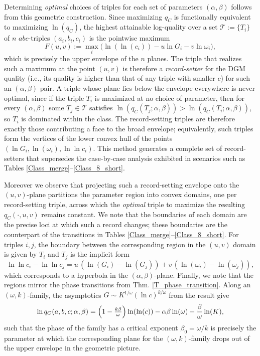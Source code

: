 \documentclass[11pt,letterpaper]{amsart}
\begin{document}
  Determining \textit{optimal} choices of triples for each set of parameters $(\alpha, \beta)$ follows from this geometric construction. Since maximizing $q_C$ is functionally equivalent to maximizing
  $\ln (q_C)$, the highest attainable log-quality over a set $\mathscr{T} := \{T_i\}$ of $n$ $abc$-triples $(a_i, b_i, c_i)$ is the pointwise maximum
  \[
      F(u,v) := \max_i\bigl(\ln(\ln (c_i)) -u\ln G_i-v\ln\omega_i\bigr),
  \]
  which is precisely the upper envelope of the $n$ planes. The triple that realizes such a maximum at the point $(u,v)$ is therefore a \textit{record-setter} for the DGM quality (i.e., its quality is higher than that of any triple with smaller $c$) for such an $(\alpha,\beta)$ pair. A triple whose plane lies below the envelope everywhere is never optimal, since if the triple $T_i$ is maximized at no choice of parameter, then for every
  $(\alpha,\beta)$ some $T_j \in \mathscr{T}$ satisfies $\ln (q_C(T_j; \alpha, \beta))>\ln (q_C(T_i; \alpha, \beta))$, so $T_i$ is dominated
  within the class. The record-setting triples are therefore exactly
  those contributing a face to the broad envelope; equivalently, such triples form the vertices of the lower convex hull of the points $(\ln G_i,\ln(\omega_i),\ln\ln c_i)$. This method generates a complete set of record-setters that  supersedes the case-by-case analysis exhibited in scenarios such as Tables \ref{Class_merge}–\ref{Class_8_short}.

  Moreover we observe that projecting such a record-setting envelope onto the $(u,v)$-plane partitions the parameter region into convex domains, one per record-setting triple, across which the \textit{optimal} triple to maximize the resulting $q_C(\cdot, u, v)$ remains constant. We note that the boundaries of each domain are the precise loci at which such a record changes; these boundaries are the counterpart of the transitions in Tables \ref{Class_merge}–\ref{Class_8_short}. For triples $i,j$, the boundary between the corresponding region in the $(u, v)$ domain is given by $T_i$ and $T_j$ is
  the implicit form
  \[
      \ln\ln c_i-\ln\ln c_j=u\,(\ln (G_i)-\ln (G_j))+v\,(\ln(\omega_i)-\ln(\omega_j)),
  \]
  which corresponds to a hyperbola in the $(\alpha, \beta)$-plane. Finally, we note that the regions mirror the phase transitions from Thm. \ref{T_phase_transition}. Along an $(\omega,k)$-family, the asymptotics $G\sim K^{1/\omega}(\ln c)^{k/\omega}$ from the result give
  \[
      \ln q_C(a,b,c;\alpha,\beta)=\Bigl(1-\tfrac{k\beta}{\omega}\Bigr)\ln(\ln (c))
          -\alpha\beta\ln(\omega) -\frac{\beta}{\omega}\ln (K),
  \]
  such that the phase of the family has a critical exponent $\beta_0 = \omega/k$ is precisely the parameter at which the corresponding plane for the $(\omega, k)$-family drops out of the upper envelope in the geometric picture.
\end{document}
